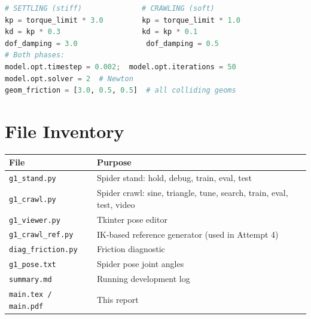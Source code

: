 \documentclass[11pt, a4paper]{article}
\begin{document}
\begin{lstlisting}[language=Python, title={Two-gain configuration}]
# SETTLING (stiff)              # CRAWLING (soft)
kp = torque_limit * 3.0         kp = torque_limit * 1.0
kd = kp * 0.3                   kd = kp * 0.1
dof_damping = 3.0                dof_damping = 0.5
# Both phases:
model.opt.timestep = 0.002;  model.opt.iterations = 50
model.opt.solver = 2  # Newton
geom_friction = [3.0, 0.5, 0.5]  # all colliding geoms
\end{lstlisting}

\section{File Inventory}

\begin{table}[H]
\centering\small
\begin{tabularx}{\textwidth}{lX}
\toprule
\textbf{File} & \textbf{Purpose} \\
\midrule
\texttt{g1\_stand.py} & Spider stand: hold, debug, train, eval, test \\
\texttt{g1\_crawl.py} & Spider crawl: sine, triangle, tune, search, train, eval, test, video \\
\texttt{g1\_viewer.py} & Tkinter pose editor \\
\texttt{g1\_crawl\_ref.py} & IK-based reference generator (used in Attempt 4) \\
\texttt{diag\_friction.py} & Friction diagnostic \\
\texttt{g1\_pose.txt} & Spider pose joint angles \\
\texttt{summary.md} & Running development log \\
\texttt{main.tex / main.pdf} & This report \\
\bottomrule
\end{tabularx}
\end{table}
\end{document}
